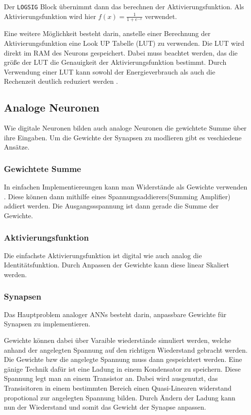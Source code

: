 \documentclass[conference]{IEEEtran}
\begin{document}
    Der \texttt{LOGSIG} Block übernimmt dann das berechnen der Aktivierungsfunktion.
    Als Aktivierungsfunktion wird hier $f(x) = \frac{1}{1+e^{-x}}$ verwendet.

    Eine weitere Möglichkeit besteht darin, anstelle einer Berechnung der Aktivierungsfunktion eine Look UP Tabelle (LUT) zu verwenden.
    Die LUT wird direkt im RAM des Neurons gespeichert.
    Dabei muss beachtet werden, das die größe der LUT die Genauigkeit der Aktivierungsfunktion bestimmt.
    Durch Verwendung einer LUT kann sowohl der Energieverbrauch als auch die Rechenzeit deutlich reduziert werden \cite{muthuramalingam2008neural} .


    \subsection{Analoge Neuronen}

    Wie digitale Neuronen bilden auch analoge Neuronen die gewichtete Summe über ihre Eingaben.
    Um die Gewichte der Synapsen zu modlieren gibt es veschiedene Ansätze.

    \subsubsection{Gewichtete Summe}
    In einfachen Implementiereungen kann man Widerstände als Gewichte verwenden \cite{zurada1992analog} .
    Diese können dann mithilfe eines Spannungsaddierers(Summing Amplifier) addiert werden.
    Die Ausgangssspannung ist dann gerade die Summe der Gewichte.


    \subsubsection{Aktivierungsfunktion}
    Die einfachste Aktivierungsfunktion ist digital wie auch analog die Identitätsfunktion.
    Durch Anpassen der Gewichte kann diese linear Skaliert werden. \cite{zurada1992analog}


    \subsubsection{Synapsen}
    Das Hauptproblem analoger ANNs besteht darin, anpassbare Gewichte für Synapsen zu implementieren.

    Gewichte können dabei über Varaible wiederstände simuliert werden, welche anhand der angelegten Spannung auf den richtigen Wiederstand gebracht werden.
    Die Gewichte bzw die angelegte Spannung muss dann gespeichtert werden.
    Eine gänige Technik dafür ist eine Ladung in einem Kondensator zu speichern.
    Diese Spannung legt man an einem Transistor an.
    Dabei wird ausgenutzt, das Transisitoren in einem bestimmten Bereich einen Quasi-Linearen widerstand propotional zur angelegten Spannung bilden.
    Durch Ändern der Ladung kann nun der Wiederstand und somit das Gewicht der Synapse anpassen.
\end{document}
